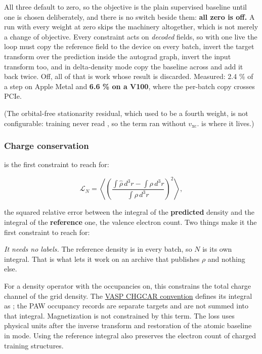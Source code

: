 All three default to zero, so the objective is the plain supervised baseline until one is chosen deliberately, and there is no switch beside them: \textbf{all zero is off.} A run with every weight at zero skips the machinery altogether, which is not merely a change of objective. Every constraint acts on \emph{decoded} fields, so with one live the loop must copy the reference field to the device on every batch, invert the target transform over the prediction inside the autograd graph, invert the input transform too, and in delta-density mode copy the baseline across and add it back twice. Off, all of that is work whose result is discarded. Measured: 2.4 \% of a step on Apple Metal and \textbf{6.6 \% on a V100}, where the per-batch copy crosses PCIe.

(The orbital-free stationarity residual, which used to be a fourth weight, is not configurable: training never read , so the term ran without $v_\mathrm{xc}$.  is where it lives.)

\subsubsection*{Charge conservation}

 is the first constraint to reach for:

\[
\mathcal{L}_{N} = \left\langle \left(
\frac{\int\hat\rho\,d^3r - \int\rho\,d^3r}{\int\rho\,d^3r}
\right)^{2} \right\rangle ,
\]

the squared relative error between the integral of the \textbf{predicted} density and the integral of the \textbf{reference} one, the valence electron count. Two things make it the first constraint to reach for:

\emph{It needs no labels.} The reference density is in every batch, so $N$ is its own integral. That is what lets it work on an archive that publishes $\rho$ and nothing else.

For a density operator with the occupancies on, this constrains the total charge channel of the grid density. The \href{https://vasp.at/wiki/index.php/CHGCAR}{VASP CHGCAR convention} defines its integral as ; the PAW occupancy records are separate targets and are not summed into that integral. Magnetization is not constrained by this term. The loss uses physical units after the inverse transform and restoration of the atomic baseline in  mode. Using the reference integral also preserves the electron count of charged training structures.

